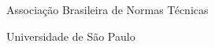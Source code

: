 \begin{siglas}
	\item[ABNT] Associação Brasileira de Normas Técnicas
	\item[USP] Universidade de São Paulo
\end{siglas}
